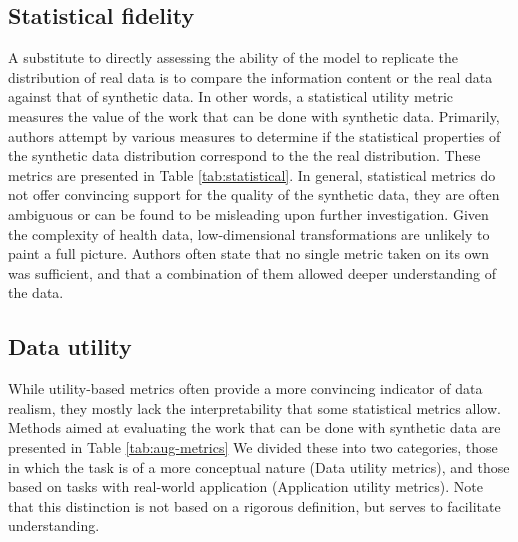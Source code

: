     \subsection{Statistical fidelity}
        A substitute to directly assessing the ability of the model to replicate the distribution of real data is to compare the information content or the real data against that of synthetic data. In other words, a statistical utility metric measures the value of the work that can be done with synthetic data. Primarily, authors attempt by various measures to determine if the statistical properties of the synthetic data distribution correspond to the the real distribution. These metrics are presented in Table \ref{tab:statistical}. In general, statistical metrics do not offer convincing support for the quality of the synthetic data, they are often ambiguous or can be found to be misleading upon further investigation. Given the complexity of health data, low-dimensional transformations are unlikely to paint a full picture. Authors often state that no single metric taken on its own was sufficient, and that a combination of them allowed deeper understanding of the data. 
     
        
    
    \subsection{Data utility}
         While utility-based metrics often provide a more convincing indicator of data realism, they mostly lack the interpretability that some statistical metrics allow. Methods aimed at evaluating the work that can be done with synthetic data are presented in Table \ref{tab:aug-metrics} We divided these into two categories, those in which the task is of a more conceptual nature (Data utility metrics), and those based on tasks with real-world application (Application utility metrics). Note that this distinction is not based on a rigorous definition, but serves to facilitate understanding.
    
    

